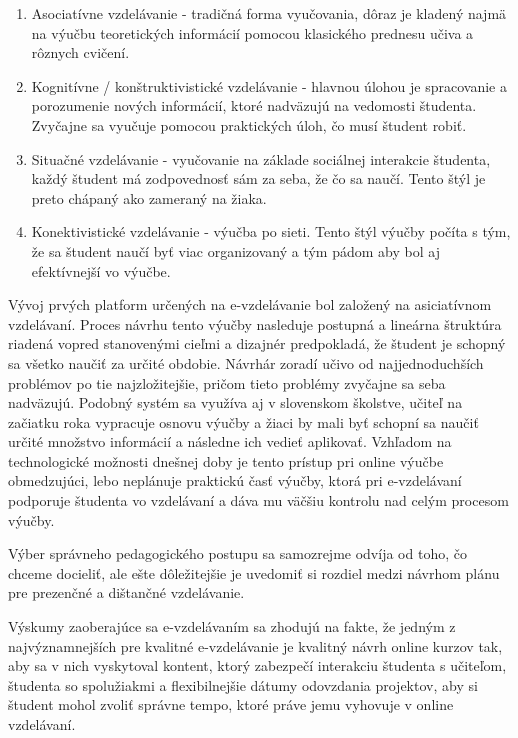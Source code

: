 \documentclass[10pt,slovak,a4paper]{article}
\begin{document}
	\begin{enumerate}
		\item Asociatívne vzdelávanie - tradičná forma vyučovania, dôraz je kladený najmä na výučbu teoretických informácií pomocou klasického prednesu učiva a rôznych cvičení.
		\item Kognitívne / konštruktivistické vzdelávanie - hlavnou úlohou je spracovanie a porozumenie nových informácií, ktoré nadväzujú na vedomosti študenta. Zvyčajne sa vyučuje pomocou praktických úloh, čo musí študent robiť.
		\item Situačné vzdelávanie - vyučovanie na základe sociálnej interakcie študenta, každý študent má zodpovednosť sám za seba, že čo sa naučí. Tento štýl je preto chápaný ako zameraný na žiaka.
		\item Konektivistické vzdelávanie - výučba po sieti. Tento štýl výučby počíta s tým, že sa študent naučí byť viac organizovaný a tým pádom aby bol aj efektívnejší vo výučbe. 
	\end{enumerate}

	Vývoj prvých platform určených na e-vzdelávanie bol založený na asiciatívnom vzdelávaní. Proces návrhu tento výučby nasleduje postupná a lineárna štruktúra riadená vopred stanovenými cieľmi a dizajnér predpokladá, že študent je schopný sa všetko naučiť za určité obdobie. Návrhár zoradí učivo od najjednoduchších problémov po tie najzložitejšie, pričom tieto problémy zvyčajne sa seba nadväzujú. Podobný systém sa využíva aj v slovenskom školstve, učiteľ na začiatku roka vypracuje osnovu výučby a žiaci by mali byť schopní sa naučiť určité množstvo informácií a následne ich vedieť aplikovať. Vzhľadom na technologické možnosti dnešnej doby je tento prístup pri online výučbe obmedzujúci, lebo neplánuje praktickú časť výučby, ktorá pri e-vzdelávaní podporuje študenta vo vzdelávaní a dáva mu väčšiu kontrolu nad  celým procesom výučby.
	\cite{main}

	Výber správneho pedagogického postupu sa samozrejme odvíja od toho, čo chceme docieliť, ale ešte dôležitejšie je uvedomiť si rozdiel medzi návrhom plánu pre prezenčné a dištančné vzdelávanie.
	\cite{main}

	Výskumy zaoberajúce sa e-vzdelávaním sa zhodujú na fakte, že jedným z najvýznamnejších pre kvalitné e-vzdelávanie je kvalitný návrh online kurzov tak, aby sa v nich vyskytoval kontent, ktorý zabezpečí interakciu študenta s učiteľom, študenta so spolužiakmi a flexibilnejšie dátumy odovzdania projektov, aby si študent mohol zvoliť správne tempo, ktoré práve jemu vyhovuje v online vzdelávaní.
	\cite{main}
\end{document}
